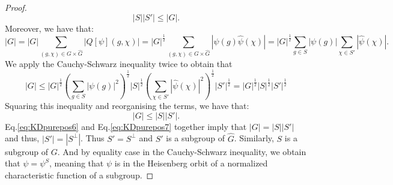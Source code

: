 \documentclass[a4paper, notitlepage, 11pt]{article}
\numberwithin{equation}{section}
\newcommand{\card}[1]{\left|#1\right|}
\begin{document}
\begin{proof}
\begin{equation}
        \card{S}\card{S'} \leqslant \card{G}.
    \end{equation}
    Moreover, we have that:
    \begin{equation}
             \card{G}=\card{G}\sum_{(g,\chi)\in G\times\hat{G}} \left|Q[\psi](g,\chi)\right| = \card{G}^{\frac{1}{2}}\sum_{(g,\chi)\in G\times\hat{G}} \left|\psi(g)\hat{\psi}(\chi)\right| = \card{G}^{\frac{1}{2}}\sum_{g\in S} \left|\psi(g)\right| \sum_{\chi\in S'}\left|\hat{\psi}(\chi)\right|.
    \end{equation}
    We apply the Cauchy-Schwarz inequality twice to obtain that
    \begin{equation}
        \card{G}\leqslant \card{G}^{\frac{1}{2}}\left(\sum_{g\in S} \left|\psi(g)\right|^2\right)^{\frac{1}{2}}\card{S}^{\frac{1}{2}}\left(\sum_{\chi\in S'}\left|\hat{\psi}(\chi)\right|^2\right)^{\frac{1}{2}}\card{S'}^{\frac{1}{2}} = \card{G}^{\frac{1}{2}}\card{S}^{\frac{1}{2}}\card{S'}^{\frac{1}{2}} 
    \end{equation}
    Squaring this inequality and reorganising the terms, we have that:
    \begin{equation}\label{eq:KDpurepos7}
        \card{G} \leqslant \card{S}\card{S'}.
    \end{equation}
    Eq.\eqref{eq:KDpurepos6} and Eq.\eqref{eq:KDpurepos7} together imply that $\card{G} = \card{S}\card{S'}$ and thus, $\card{S'} = \card{S^{\perp}}$. Thus $S'=S^{\perp}$ and $S'$ is a subgroup of $\hat{G}$. Similarly, $S$ is a subgroup of $G$. And by equality case in the Cauchy-Schwarz inequality, we obtain that $\psi = \psi^{S}$, meaning that $\psi$ is in the Heisenberg orbit of a normalized characteristic function of a subgroup.  
\end{proof}
\end{document}
